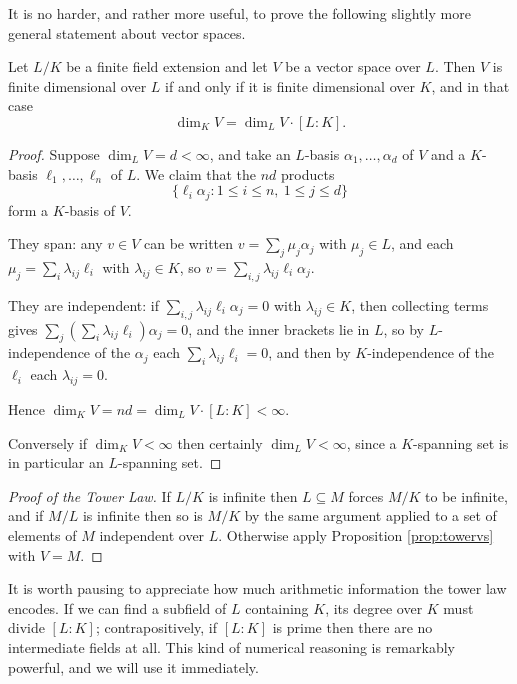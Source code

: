 \documentclass[a4paper]{scrartcl}
\begin{document}
It is no harder, and rather more useful, to prove the following slightly more general statement about vector spaces.

\begin{proposition}\label{prop:towervs}
	Let $L/K$ be a finite field extension and let $V$ be a vector space over $L$. Then $V$ is finite dimensional over $L$ if and only if it is finite dimensional over $K$, and in that case
	$$\dim_K V = \dim_L V \cdot [L : K].$$
\end{proposition}

\begin{proof}
	Suppose $\dim_L V = d < \infty$, and take an $L$-basis $\alpha_1, \dots, \alpha_d$ of $V$ and a $K$-basis $\ell_1, \dots, \ell_n$ of $L$. We claim that the $nd$ products
	$$\{\ell_i \alpha_j : 1 \leq i \leq n,\ 1 \leq j \leq d\}$$
	form a $K$-basis of $V$.

	They span: any $v \in V$ can be written $v = \sum_{j} \mu_j \alpha_j$ with $\mu_j \in L$, and each $\mu_j = \sum_i \lambda_{ij} \ell_i$ with $\lambda_{ij} \in K$, so $v = \sum_{i,j} \lambda_{ij} \ell_i \alpha_j$.

	They are independent: if $\sum_{i,j} \lambda_{ij} \ell_i \alpha_j = 0$ with $\lambda_{ij} \in K$, then collecting terms gives $\sum_j \left( \sum_i \lambda_{ij}\ell_i \right)\alpha_j = 0$, and the inner brackets lie in $L$, so by $L$-independence of the $\alpha_j$ each $\sum_i \lambda_{ij} \ell_i = 0$, and then by $K$-independence of the $\ell_i$ each $\lambda_{ij} = 0$.

	Hence $\dim_K V = nd = \dim_L V \cdot [L:K] < \infty$.

	Conversely if $\dim_K V < \infty$ then certainly $\dim_L V < \infty$, since a $K$-spanning set is in particular an $L$-spanning set.
\end{proof}

\begin{proof}[Proof of the Tower Law]
	If $L/K$ is infinite then $L \subseteq M$ forces $M/K$ to be infinite, and if $M/L$ is infinite then so is $M/K$ by the same argument applied to a set of elements of $M$ independent over $L$. Otherwise apply Proposition \ref{prop:towervs} with $V = M$.
\end{proof}

It is worth pausing to appreciate how much arithmetic information the tower law encodes. If we can find a subfield of $L$ containing $K$, its degree over $K$ must divide $[L:K]$; contrapositively, if $[L:K]$ is prime then there are no intermediate fields at all. This kind of numerical reasoning is remarkably powerful, and we will use it immediately.
\end{document}
